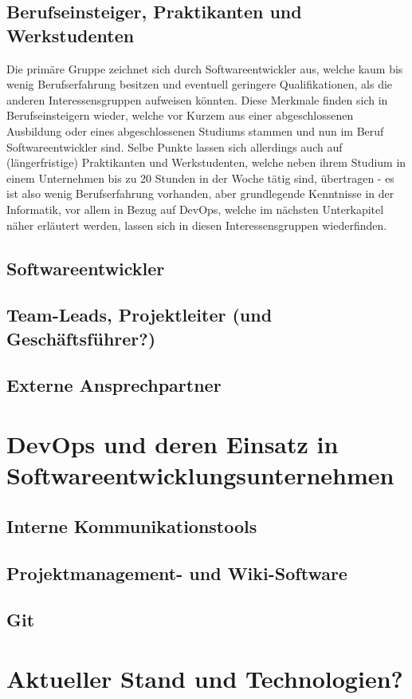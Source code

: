 \subsection{Berufseinsteiger, Praktikanten und Werkstudenten}
Die primäre Gruppe zeichnet sich durch Softwareentwickler aus, welche kaum bis wenig Berufserfahrung besitzen und eventuell geringere Qualifikationen, als die anderen Interessensgruppen aufweisen könnten.
Diese Merkmale finden sich in Berufseinsteigern wieder, welche vor Kurzem aus einer abgeschlossenen Ausbildung oder eines abgeschlossenen Studiums stammen und nun im Beruf Softwareentwickler sind. Selbe Punkte
lassen sich allerdings auch auf (längerfristige) Praktikanten und Werkstudenten, welche neben ihrem Studium in einem Unternehmen bis zu 20 Stunden in der Woche tätig sind, übertragen - es ist also wenig Berufserfahrung
vorhanden, aber grundlegende Kenntnisse in der Informatik, vor allem in Bezug auf DevOps, welche im nächsten Unterkapitel näher erläutert werden, lassen sich in diesen Interessensgruppen wiederfinden.

\subsection{Softwareentwickler}

\subsection{Team-Leads, Projektleiter (und Geschäftsführer?)}

\subsection{Externe Ansprechpartner}

\section{DevOps und deren Einsatz in Softwareentwicklungsunternehmen}

\subsection{Interne Kommunikationstools}

\subsection{Projektmanagement- und Wiki-Software}

\subsection{Git}

\section{Aktueller Stand und Technologien?}
